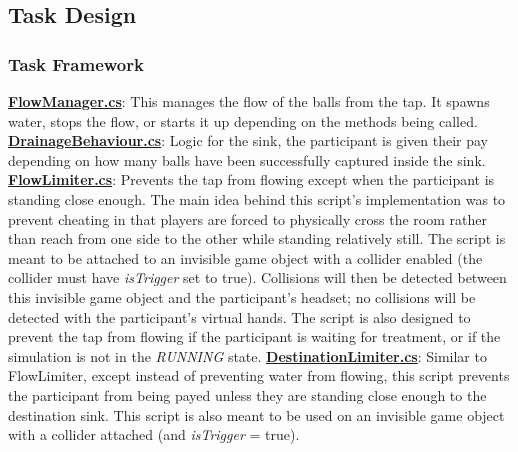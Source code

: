 \documentclass{article}
\begin{document}
\subsection{Task Design}
\subsubsection{Task Framework} %
\href{https://bit.ly/2WrbyxT}{\textbf{FlowManager.cs}}: This manages the flow of the balls from the tap. It spawns water, stops the flow, or starts it up depending on the methods being called.   \newline \newline 
\href{https://bit.ly/2YtMEjd}{\textbf{DrainageBehaviour.cs}}: Logic for the sink, the participant is given their pay depending on how many balls have been successfully captured inside the sink. \newline \newline 
\href{https://bit.ly/2TUX1h4}{\textbf{FlowLimiter.cs}}: Prevents the tap from flowing except when the participant is standing close enough. The main idea behind this script's implementation was to prevent cheating in that players are forced to physically cross the room rather than reach from one side to the other while standing relatively still. The script is meant to be attached to an invisible game object with a collider enabled (the collider must have \textit{isTrigger} set to true). Collisions will then be detected between this invisible game object and the participant's headset; no collisions will be detected with the participant's virtual hands. The script is also designed to prevent the tap from flowing if the participant is waiting for treatment, or if the simulation is not in the \textit{RUNNING} state. \newline \newline
\href{https://bit.ly/2JGhr8M}{\textbf{DestinationLimiter.cs}}: Similar to FlowLimiter, except instead of preventing water from flowing, this script prevents the participant from being payed unless they are standing close enough to the destination sink. This script is also meant to be used on an invisible game object with a collider attached (and \textit{isTrigger} = true). 
\end{document}
